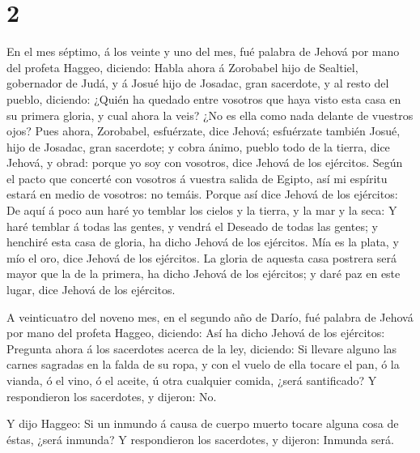 \hypertarget{section-1}{%
\section{2}\label{section-1}}

 En el mes séptimo, á los veinte y uno del mes, fué palabra
de Jehová por mano del profeta Haggeo, diciendo:  Habla
ahora á Zorobabel hijo de Sealtiel, gobernador de Judá, y á Josué hijo
de Josadac, gran sacerdote, y al resto del pueblo, diciendo:
 ¿Quién ha quedado entre vosotros que haya visto esta casa
en su primera gloria, y cual ahora la veis? ¿No es ella como nada
delante de vuestros ojos?  Pues ahora, Zorobabel,
esfuérzate, dice Jehová; esfuérzate también Josué, hijo de Josadac, gran
sacerdote; y cobra ánimo, pueblo todo de la tierra, dice Jehová, y
obrad: porque yo soy con vosotros, dice Jehová de los ejércitos.
 Según el pacto que concerté con vosotros á vuestra salida
de Egipto, así mi espíritu estará en medio de vosotros: no temáis.
 Porque así dice Jehová de los ejércitos: De aquí á poco aun
haré yo temblar los cielos y la tierra, y la mar y la seca: 
Y haré temblar á todas las gentes, y vendrá el Deseado de todas las
gentes; y henchiré esta casa de gloria, ha dicho Jehová de los
ejércitos.  Mía es la plata, y mío el oro, dice Jehová de
los ejércitos.  La gloria de aquesta casa postrera será
mayor que la de la primera, ha dicho Jehová de los ejércitos; y daré paz
en este lugar, dice Jehová de los ejércitos.

 A veinticuatro del noveno mes, en el segundo año de Darío,
fué palabra de Jehová por mano del profeta Haggeo, diciendo:
 Así ha dicho Jehová de los ejércitos: Pregunta ahora á los
sacerdotes acerca de la ley, diciendo:  Si llevare alguno
las carnes sagradas en la falda de su ropa, y con el vuelo de ella
tocare el pan, ó la vianda, ó el vino, ó el aceite, ú otra cualquier
comida, ¿será santificado? Y respondieron los sacerdotes, y dijeron:
No.~

 Y dijo Haggeo: Si un inmundo á causa de cuerpo muerto
tocare alguna cosa de éstas, ¿será inmunda? Y respondieron los
sacerdotes, y dijeron: Inmunda será.

